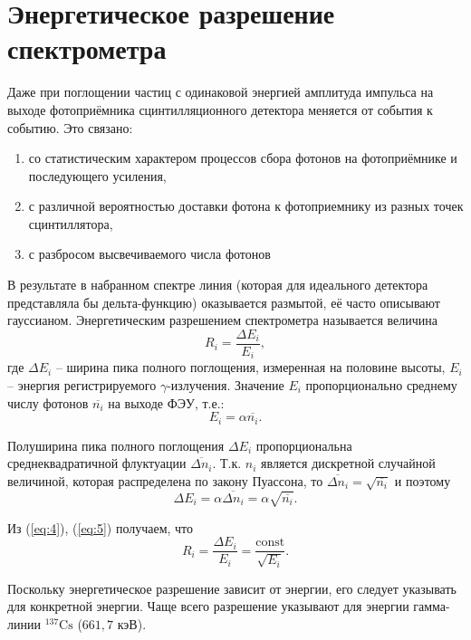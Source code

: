 \documentclass[a4paper]{article}
\begin{document}
\section{Энергетическое разрешение спектрометра} Даже при поглощении частиц с одинаковой энергией амплитуда импульса на выходе фотоприёмника сцинтилляционного детектора меняется от события к событию. Это связано:
\begin{enumerate}
\item со статистическим характером процессов сбора фотонов на фотоприёмнике и последующего усиления,
\item с различной вероятностью доставки фотона к фотоприемнику из разных точек сцинтиллятора,
\item с разбросом высвечиваемого числа фотонов
\end{enumerate}

\noindent В результате в набранном спектре линия (которая для идеального детектора представляла бы дельта-функцию) оказывается размытой, её часто описывают гауссианом. Энергетическим разрешением спектрометра называется величина
\begin{equation}
R_i=\frac{\Delta E_i}{E_i},
\end{equation}
где $\Delta E_i$ -- ширина пика полного поглощения, измеренная на половине высоты, $E_i$ -- энергия регистрируемого $\gamma$-излучения. Значение $E_i$ пропорционально среднему числу фотонов $\overline{n_i}$ на выходе ФЭУ, т.е.:
\begin{equation}
E_i=\alpha\overline{n_i}.
\label{eq:4}
\end{equation}

\noindent Полуширина пика полного поглощения $\Delta E_i$ пропорциональна среднеквадратичной флуктуации $\overline{\Delta n_i}$. Т.к. $n_i$ является дискретной случайной величиной, которая распределена по закону Пуассона, то $\overline{\Delta n_i}=\sqrt{\overline{n_i}}$ и поэтому
\begin{equation}
\Delta E_i=\alpha\overline{\Delta n_i}=\alpha\sqrt{\overline{n_i}}.
\label{eq:5}
\end{equation}

\noindent Из (\ref{eq:4}), (\ref{eq:5}) получаем, что
\begin{equation}
R_i=\frac{\Delta E_i}{E_i}=\frac{\text{const}}{\sqrt{E_i}}.
\label{eq:6}
\end{equation}

\noindent Поскольку энергетическое разрешение зависит от энергии, его следует указывать для конкретной энергии. Чаще всего разрешение указывают для энергии гамма-линии $^{137}\text{Cs}$ ($661,7$ кэВ).
\end{document}
